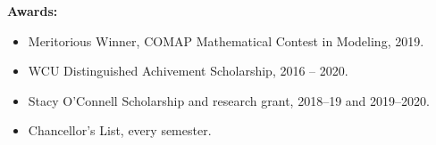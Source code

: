 \textbf{Awards:}

\begin{itemize}[noitemsep]
\item Meritorious Winner, COMAP Mathematical Contest in Modeling, 2019.
\item WCU Distinguished Achivement Scholarship, 2016 -- 2020.
\item Stacy O'Connell Scholarship and research grant, 2018--19 and 2019--2020. 
\item Chancellor's List, every semester.
\end{itemize}